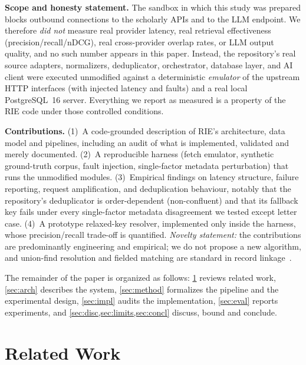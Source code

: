 \documentclass[conference]{IEEEtran}
\newcommand{\RIE}{RIE}
\begin{document}
\textbf{Scope and honesty statement.} The sandbox in which this study was prepared blocks outbound connections to the scholarly APIs and to the LLM endpoint. We therefore \emph{did not} measure real provider latency, real retrieval effectiveness (precision/recall/nDCG), real cross-provider overlap rates, or LLM output quality, and no such number appears in this paper. Instead, the repository's real source adapters, normalizers, deduplicator, orchestrator, database layer, and AI client were executed unmodified against a deterministic \emph{emulator} of the upstream HTTP interfaces (with injected latency and faults) and a real local PostgreSQL~16 server. Everything we report as measured is a property of the \RIE{} code under those controlled conditions.

\textbf{Contributions.} (1)~A code-grounded description of \RIE's architecture, data model and pipelines, including an audit of what is implemented, validated and merely documented. (2)~A reproducible harness (fetch emulator, synthetic ground-truth corpus, fault injection, single-factor metadata perturbation) that runs the unmodified modules. (3)~Empirical findings on latency structure, failure reporting, request amplification, and deduplication behaviour, notably that the repository's deduplicator is order-dependent (non-confluent) and that its fallback key fails under every single-factor metadata disagreement we tested except letter case. (4)~A prototype relaxed-key resolver, implemented only inside the harness, whose precision/recall trade-off is quantified. \emph{Novelty statement:} the contributions are predominantly engineering and empirical; we do not propose a new algorithm, and union-find resolution and fielded matching are standard in record linkage~\cite{fellegi1969theory,elmagarmid2007duplicate,christen2012data}.

The remainder of the paper is organized as follows: \cref{sec:related} reviews related work, \cref{sec:arch} describes the system, \cref{sec:method} formalizes the pipeline and the experimental design, \cref{sec:impl} audits the implementation, \cref{sec:eval} reports experiments, and \cref{sec:disc,sec:limits,sec:concl} discuss, bound and conclude.

\section{Related Work}
\label{sec:related}
\end{document}
